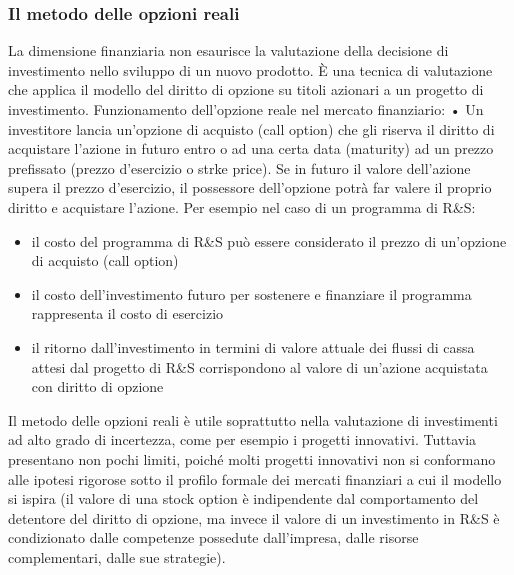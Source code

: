 \documentclass{article}
\begin{document}
\subsubsection{Il metodo delle opzioni reali}

La dimensione finanziaria non esaurisce la valutazione della decisione
	di investimento nello sviluppo di un nuovo prodotto.
	È una tecnica di valutazione che applica il modello del diritto di opzione
	su titoli azionari a un progetto di investimento.
	Funzionamento dell’opzione reale nel mercato finanziario:
	• Un investitore lancia un’opzione di acquisto (call option) che gli
	riserva il diritto di acquistare l’azione in futuro entro o ad una certa
	data (maturity) ad un prezzo prefissato (prezzo d’esercizio o strke
	price). Se in futuro il valore dell’azione supera il prezzo d’esercizio, il
	possessore dell’opzione potrà far valere il proprio diritto e
	acquistare l’azione.
		Per esempio nel caso di un programma di R\&S:
	\begin{itemize}
	
		\item il costo del programma di R\&S può essere considerato il prezzo di
		un’opzione di acquisto (call option)
		\item il costo dell’investimento futuro per sostenere e finanziare il
		programma rappresenta il costo di esercizio
		\item il ritorno dall’investimento in termini di valore attuale dei flussi di
		cassa attesi dal progetto di R\&S corrispondono al valore di
		un’azione acquistata con diritto di opzione
	\end{itemize}
	Il metodo delle opzioni reali è utile soprattutto nella valutazione di
	investimenti ad alto grado di incertezza, come per esempio i progetti
	innovativi.
	Tuttavia presentano non pochi limiti, poiché molti progetti innovativi
	non si conformano alle ipotesi rigorose sotto il profilo formale dei
	mercati finanziari a cui il modello si ispira (il valore di una stock option è
	indipendente dal comportamento del detentore del diritto di opzione,
	ma invece il valore di un investimento in R\&S è condizionato dalle
	competenze possedute dall’impresa, dalle risorse complementari, dalle
	sue strategie).
\end{document}
